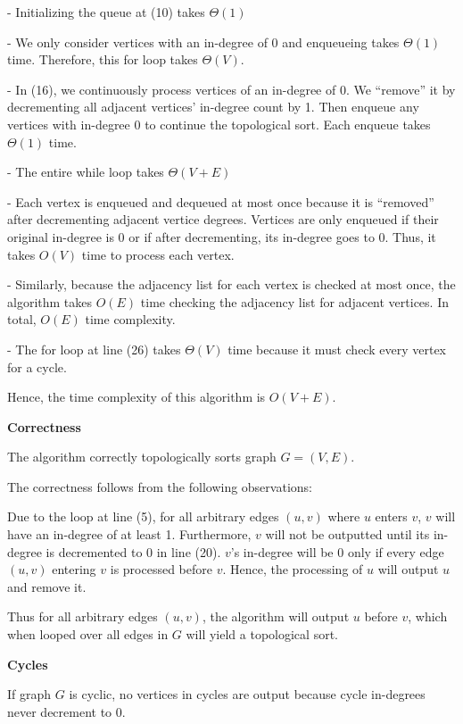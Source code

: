 \documentclass[a4paper]{report}
\begin{document}
\begin{enumerate}
      - Initializing the queue at (10) takes $\Theta(1)$

      - We only consider vertices with an in-degree of 0 and enqueueing takes $\Theta(1)$ time. Therefore, this for loop takes
      $\Theta(V)$.

      - In (16), we continuously process vertices of an in-degree of 0. We ``remove'' it by decrementing all adjacent vertices'
      in-degree count by 1. Then enqueue any vertices with in-degree 0 to continue the topological sort. Each enqueue takes
      $\Theta(1)$ time. 

      - The entire while loop takes $\Theta(V+E)$ 
      
        - Each vertex is enqueued and dequeued at most once because it is ``removed'' after decrementing adjacent vertice degrees.
      Vertices are only enqueued if their original in-degree is 0 or if after decrementing, its in-degree goes to 0. Thus, 
      it takes $O(V)$ time to process each vertex.

        - Similarly, because the adjacency list for each vertex is checked at most once, the algorithm takes $O(E)$ time checking
        the adjacency list for adjacent vertices. In total, $O(E)$ time complexity. 

      - The for loop at line (26) takes $\Theta(V)$ time because it must check every vertex for a cycle.

      Hence, the time complexity of this algorithm is $O(V+E)$.

      {\bf Correctness}

      The algorithm correctly topologically sorts graph $G=(V,E)$. 
      
      The correctness follows from the following observations:
      
      Due to the loop at line (5), for all arbitrary edges $(u,v)$ where $u$ enters $v$, $v$ will have an in-degree of at least 1. 
      Furthermore, $v$ will not be outputted until its in-degree is decremented to 0 in line (20). $v$'s in-degree
      will be 0 only if every edge $(u,v)$ entering $v$ is processed before $v$. Hence, the processing of $u$ will 
      output $u$ and remove it. 

      Thus for all arbitrary edges $(u,v)$, the algorithm will output $u$ before $v$, which when looped over all edges in $G$ will
      yield a topological sort. 

      {\bf Cycles}

      If graph $G$ is cyclic, no vertices in cycles are output because cycle in-degrees never decrement to 0. 
      

\end{enumerate}
\end{document}
